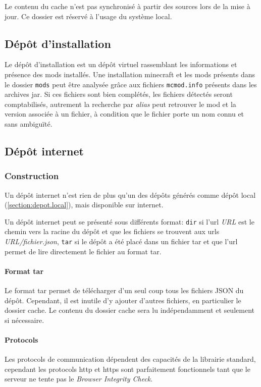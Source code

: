 \documentclass{article}
\begin{document}
Le contenu du cache n'est pas synchronisé à partir des sources lors de la mise à jour.
Ce dossier est réservé à l'usage du système local.

\subsection{Dépôt d'installation}
\label{section:depot.installation}
Le dépôt d'installation est un dépôt virtuel rassemblant les informations et présence des mods installés.
Une installation minecraft et les mods présents dans le dossier \texttt{mods} peut être analysée grâce aux fichiers \texttt{mcmod.info} présents dans les archives jar.
Si ces fichiers sont bien complétés, les fichiers détectés seront comptabilisés, autrement la recherche par \textit{alias} peut retrouver le mod et la version associée à un fichier, à condition que le fichier porte un nom connu et sans ambiguïté.

\subsection{Dépôt internet}
\label{section:depot.internet}
\subsubsection{Construction}
Un dépôt internet n'est rien de plus qu'un des dépôts générés comme dépôt local (\ref{section:depot.local}), mais disponible sur internet.

Un dépôt internet peut se présenté sous différents format: \texttt{dir} si l'url \textit{URL} est le chemin vers la racine du dépôt et que les fichiers se trouvent aux urls \textit{URL/fichier.json}, \texttt{tar} si le dépôt a été placé dans un fichier tar et que l'url permet de lire directement le fichier au format tar.

\paragraph{Format tar}
Le format tar permet de télécharger d'un seul coup tous les fichiers JSON du dépôt.
Cependant, il est inutile d'y ajouter d'autres fichiers, en particulier le dossier cache.
Le contenu du dossier cache sera lu indépendamment et seulement si nécessaire.

\paragraph{Protocols}
Les protocols de communication dépendent des capacités de la librairie standard, cependant les protocols http et https sont parfaitement fonctionnels tant que le serveur ne tente pas le \textit{Browser Integrity Check}.
\end{document}
